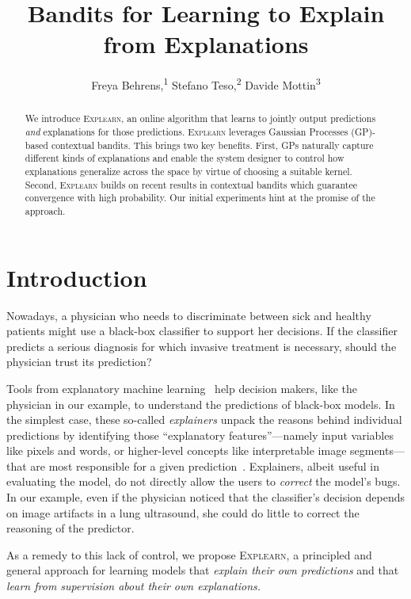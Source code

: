 \documentclass[letterpaper]{article} %
\title{Bandits for Learning to Explain from Explanations}
\author {
    Freya Behrens,\textsuperscript{\rm 1}
    Stefano Teso,\textsuperscript{\rm 2}
    Davide Mottin\textsuperscript{\rm 3} \\
}
\newcommand{\explearn}{\textsc{Explearn}\xspace}
\begin{document}
\maketitle


\begin{abstract}
    We introduce \explearn, an online algorithm that learns to jointly output predictions \emph{and} explanations for those predictions.
    \explearn leverages Gaussian Processes (GP)-based contextual bandits.
    This brings two key benefits.
    First, GPs naturally capture different kinds of explanations and enable the system designer to control how explanations generalize across the space by virtue of choosing a suitable kernel.
    Second, \explearn builds on recent results in contextual bandits which guarantee convergence with high probability.
    Our initial experiments hint at the promise of the approach.
\end{abstract}


\section{Introduction}
\label{sec:introduction}

Nowadays, a physician who needs to discriminate between sick and healthy patients might use a black-box classifier to support her decisions.  If the classifier predicts a serious diagnosis for which invasive treatment is necessary, should the physician trust its prediction?

Tools from explanatory machine learning~\cite{guidotti2018survey} help decision makers, like the physician in our example, to understand the predictions of black-box models.  In the simplest case, these so-called \emph{explainers} unpack the reasons behind individual predictions by identifying those ``explanatory features''---namely input variables like pixels and words, or higher-level concepts like interpretable image segments---that are most responsible for a given prediction~\cite{guidotti2018local}.
Explainers, albeit useful in evaluating the model, do not directly allow the users to \emph{correct} the model's bugs.  In our example, even if the physician noticed that the classifier's decision depends on image artifacts in a lung ultrasound, she could do little to correct the reasoning of the predictor.

As a remedy to this lack of control, we propose \explearn, a principled and general approach for learning models that \emph{explain their own predictions} and that \emph{learn from supervision about their own explanations.}
\end{document}
